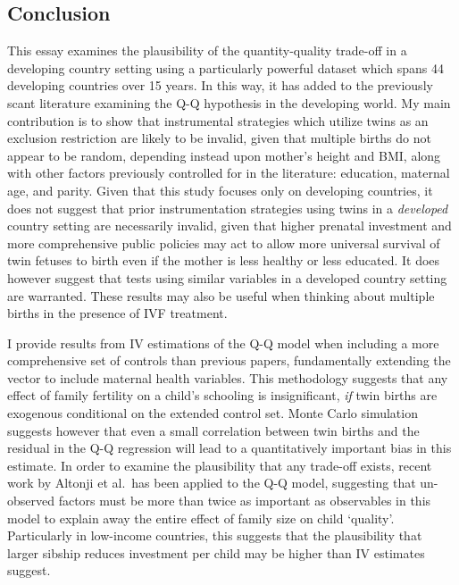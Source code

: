 \documentclass{article}[11pt,subeqn]
\begin{document}
\begin{spacing}{1.5}
\section{Conclusion}
\label{scn:conclusion}
This essay examines the plausibility of the quantity-quality trade-off in a developing country setting using a particularly powerful dataset which spans 44 developing countries 
over 15 years.  In this way, it has added to the previously scant literature examining the Q-Q hypothesis in the developing world.  My main contribution is to show that 
instrumental strategies which utilize twins as an exclusion restriction are likely to be invalid, given that multiple births do not appear to be random, depending instead upon mother's 
height and BMI, along with other factors previously controlled for in the literature: education, maternal age, and parity.  Given that this study focuses only on developing countries, 
it does not suggest that prior instrumentation strategies using twins in a \emph{developed} country setting are necessarily invalid, given that higher prenatal investment and
more comprehensive public policies may act to allow more universal survival of twin fetuses to birth even if the mother is less healthy or less educated.  It does however suggest 
that tests using similar variables in a developed country setting are warranted.  These results may also  be useful when thinking about multiple births in the presence of IVF treatment.

I provide results from IV estimations of the Q-Q model when including a more comprehensive set of controls than previous papers, fundamentally extending the vector to include 
maternal health variables. This methodology suggests that any effect of family fertility on a child's schooling is insignificant, \emph{if} twin births are exogenous conditional on 
the extended control set.  Monte Carlo simulation suggests however that even a small correlation between twin births and the residual in the Q-Q regression will lead to a 
quantitatively important bias in this estimate.  In order to examine the plausibility that any trade-off exists, recent work by Altonji et al.\ has been applied to the Q-Q model, suggesting 
that un-observed factors must be more than twice as important as observables in this model to explain away the entire effect of family size on child `quality'.  Particularly in 
low-income countries, this suggests that the plausibility that larger sibship reduces investment per child may be higher than IV estimates suggest.


\end{spacing}
\end{document}
